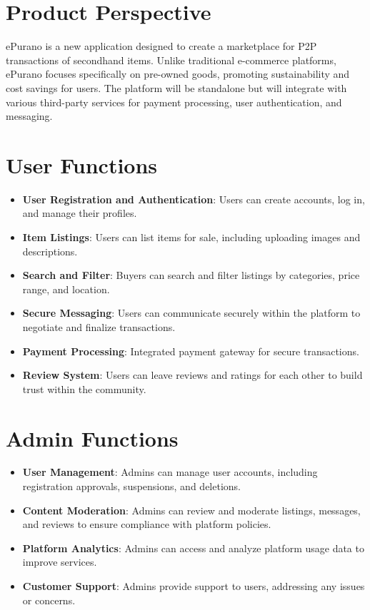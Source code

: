
\section{Product Perspective}

ePurano is a new application designed to create a marketplace for P2P transactions of secondhand items. Unlike traditional e-commerce platforms, ePurano focuses specifically on pre-owned goods, promoting sustainability and cost savings for users. The platform will be standalone but will integrate with various third-party services for payment processing, user authentication, and messaging.


\section{User Functions}

\begin{itemize}
    \item \textbf{User Registration and Authentication}: Users can create accounts, log in, and manage their profiles.
    \item \textbf{Item Listings}: Users can list items for sale, including uploading images and descriptions.
    \item \textbf{Search and Filter}: Buyers can search and filter listings by categories, price range, and location.
    \item \textbf{Secure Messaging}: Users can communicate securely within the platform to negotiate and finalize transactions.
    \item \textbf{Payment Processing}: Integrated payment gateway for secure transactions.
    \item \textbf{Review System}: Users can leave reviews and ratings for each other to build trust within the community.
\end{itemize}

\section{Admin Functions}

\begin{itemize}
    \item \textbf{User Management}: Admins can manage user accounts, including registration approvals, suspensions, and deletions.
    \item \textbf{Content Moderation}: Admins can review and moderate listings, messages, and reviews to ensure compliance with platform policies.
    \item \textbf{Platform Analytics}: Admins can access and analyze platform usage data to improve services.
    \item \textbf{Customer Support}: Admins provide support to users, addressing any issues or concerns.
\end{itemize}

